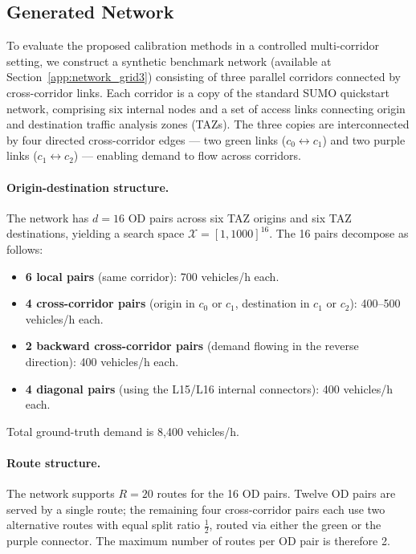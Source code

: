 \documentclass[11pt]{article}
\begin{document}
\subsection{Generated Network}




To evaluate the proposed calibration methods in a controlled multi-corridor
setting, we construct a synthetic benchmark network (available at Section~\ref{app:network_grid3})  consisting of three
parallel corridors connected by cross-corridor links.
Each corridor is a copy of the standard SUMO quickstart network, comprising
six internal nodes and a set of access links connecting origin and destination
traffic analysis zones (TAZs). The three copies are interconnected by four
directed cross-corridor edges — two green links ($c_0 \leftrightarrow c_1$)
and two purple links ($c_1 \leftrightarrow c_2$) — enabling demand to flow
across corridors.

\paragraph{Origin-destination structure.}
The network has $d = 16$ OD pairs across six TAZ origins and six TAZ
destinations, yielding a search space $\mathcal{X} = [1, 1000]^{16}$.
The 16 pairs decompose as follows:
\begin{itemize}
    \item \textbf{6 local pairs} (same corridor): 700 vehicles/h each.
    \item \textbf{4 cross-corridor pairs} (origin in $c_0$ or $c_1$,
          destination in $c_1$ or $c_2$): 400--500 vehicles/h each.
    \item \textbf{2 backward cross-corridor pairs} (demand flowing in the
          reverse direction): 400 vehicles/h each.
    \item \textbf{4 diagonal pairs} (using the L15/L16 internal connectors):
          400 vehicles/h each.
\end{itemize}
Total ground-truth demand is 8{,}400 vehicles/h.

\paragraph{Route structure.}
The network supports $R = 20$ routes for the 16 OD pairs. Twelve OD pairs
are served by a single route; the remaining four cross-corridor pairs each
use two alternative routes with equal split ratio $\tfrac{1}{2}$, routed
via either the green or the purple connector. The maximum number of routes
per OD pair is therefore 2.
\end{document}
